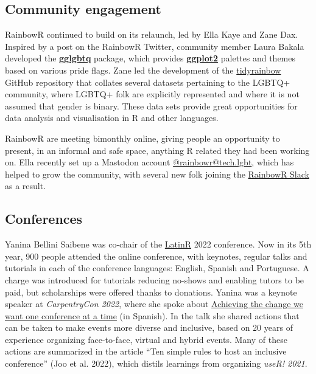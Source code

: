 \hypertarget{community-engagement}{%
\subsection{Community engagement}\label{community-engagement}}

RainbowR continued to build on its relaunch, led by Ella Kaye and Zane Dax. Inspired by a post on the RainbowR Twitter, community member Laura Bakala developed the \href{https://cran.r-project.org/package=gglgbtq}{\textbf{gglgbtq}} package, which provides \href{https://cran.r-project.org/package=ggplot2}{\textbf{ggplot2}} palettes and themes based on various pride flags. Zane led the development of the \href{https://github.com/r-lgbtq/tidyrainbow}{tidyrainbow} GitHub repository that collates several datasets pertaining to the LGBTQ+ community, where LGBTQ+ folk are explicitly represented and where it is not assumed that gender is binary. These data sets provide great opportunities for data analysis and visualisation in R and other languages.

RainbowR are meeting bimonthly online, giving people an opportunity to present, in an informal and safe space, anything R related they had been working on. Ella recently set up a Mastodon account \href{https://tech.lgbt/@rainbowR}{@rainbowr@tech.lgbt}, which has helped to grow the community, with several new folk joining the \href{https://docs.google.com/forms/d/1y7SOWE3IW-fpR_5Cd4mK-CMUpFZ-hvhY4cTj34JqTVE/viewform?edit_requested=true}{RainbowR Slack} as a result.

\hypertarget{conferences}{%
\subsection{Conferences}\label{conferences}}

Yanina Bellini Saibene was co-chair of the \href{https://latin-r.com/en}{LatinR} 2022 conference. Now in its 5th year, 900 people attended the online conference, with keynotes, regular talks and tutorials in each of the conference languages: English, Spanish and Portuguese. A charge was introduced for tutorials reducing no-shows and enabling tutors to be paid, but scholarships were offered thanks to donations. Yanina was a keynote speaker at \emph{CarpentryCon 2022}, where she spoke about \href{https://yabellini.netlify.app/talk/keynote_carpentrycon_2022/}{Achieving the change we want one conference at a time} (in Spanish). In the talk she shared actions that can be taken to make events more diverse and inclusive, based on 20 years of experience organizing face-to-face, virtual and hybrid events. Many of these actions are summarized in the article ``Ten simple rules to host an inclusive conference'' (Joo et al. 2022), which distils learnings from organizing \emph{useR! 2021}.

